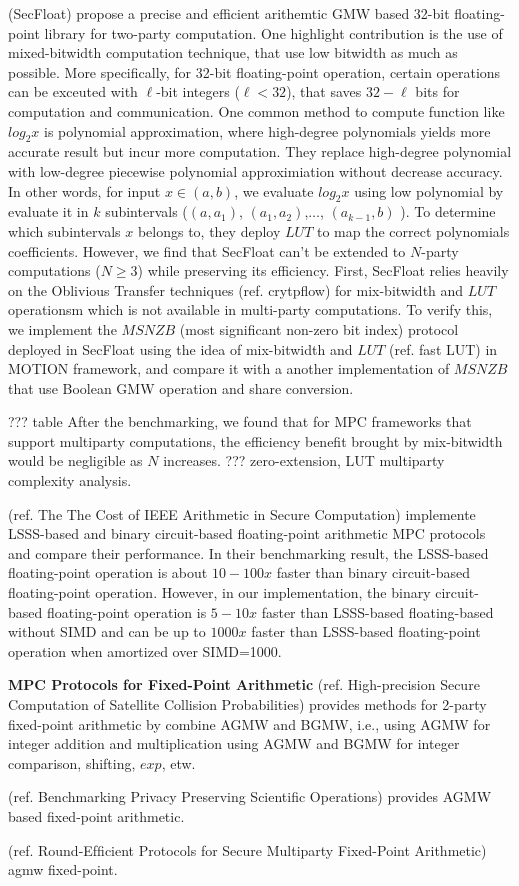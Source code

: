 (SecFloat) propose a precise and efficient arithemtic GMW based 32-bit floating-point library for two-party computation. One highlight contribution is the use of mixed-bitwidth computation technique, that use low bitwidth as much as possible. More specifically, for 32-bit floating-point operation, certain operations can be exceuted with $\ell$-bit integers ($\ell <32$), that saves $32-\ell$ bits for computation and communication. One common method to compute function like $log_{2}x$ is polynomial approximation, where high-degree polynomials yields more accurate result but incur more computation. They replace high-degree polynomial with low-degree piecewise polynomial approximiation without decrease accuracy. In other words, for input $x\in \left(a,b\right) $, we evaluate $log_2 x$ using low polynomial by evaluate it in $k$ subintervals ($\left(a, a_1\right) $, $\left(a_1, a_2\right)  $,$\ldots$, $\left(a_{k-1}, b\right) $  ). To determine which subintervals $x$ belongs to, they deploy $LUT$ to map the correct polynomials coefficients. However, we find that SecFloat can't be extended to $N$-party computations ($N\geq 3$) while preserving its efficiency. First, SecFloat relies heavily on the Oblivious Transfer techniques (ref. crytpflow) for mix-bitwidth and $LUT$ operationsm which is not available in multi-party computations. To verify this, we implement the $MSNZB$ (most significant non-zero bit index) protocol deployed in SecFloat using the idea of mix-bitwidth and $LUT$ (ref. fast LUT) in MOTION framework, and compare it with a another implementation of $MSNZB$ that use Boolean GMW operation and share conversion. 

??? table
After the benchmarking, we found that for MPC frameworks that support multiparty computations, the efficiency benefit brought by mix-bitwidth would be negligible as $N$ increases. ??? zero-extension, LUT multiparty complexity analysis. 



(ref. The The Cost of IEEE Arithmetic in Secure Computation) implemente LSSS-based and binary circuit-based floating-point arithmetic MPC protocols and compare their performance. In their benchmarking result, the LSSS-based floating-point operation is about $10-100x$ faster than binary circuit-based floating-point operation. However, in our implementation, the binary circuit-based floating-point operation is $5-10x$ faster than LSSS-based floating-based without SIMD and can be up to $1000x$ faster than LSSS-based floating-point operation when amortized over SIMD=1000.

\textbf{MPC Protocols for Fixed-Point Arithmetic}
(ref. High-precision Secure Computation of Satellite Collision Probabilities) provides methods for 2-party fixed-point arithmetic by combine AGMW and BGMW, i.e., using AGMW for integer addition and multiplication using AGMW and BGMW for integer comparison, shifting, $exp$, etw. 

(ref.  Benchmarking Privacy Preserving Scientific Operations) provides AGMW based fixed-point arithmetic. 

(ref. Round-Efﬁcient Protocols for Secure Multiparty Fixed-Point Arithmetic) agmw fixed-point. 






